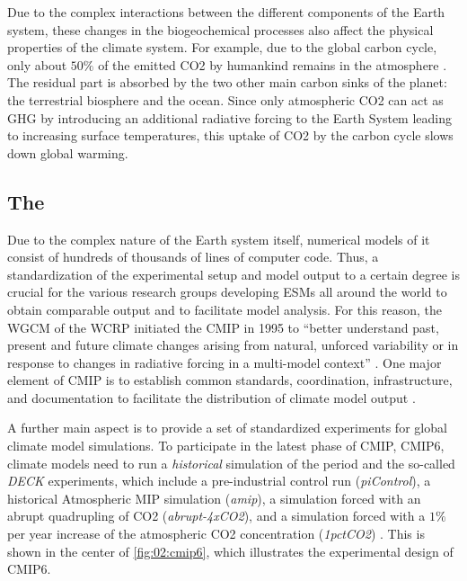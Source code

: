 Due to the complex interactions between the different components of the Earth
system, these changes in the biogeochemical processes also affect the physical
properties of the climate system. For example, due to the global carbon cycle,
only about $50 \unit{\%}$ of the emitted \ac{CO2} by humankind remains in the
atmosphere \autocite{Friedlingstein2020}. The residual part is absorbed by the
two other main carbon sinks of the planet: the terrestrial biosphere and the
ocean. Since only atmospheric \ac{CO2} can act as \ac{GHG} by introducing an
additional radiative forcing to the Earth System leading to increasing surface
temperatures, this uptake of \ac{CO2} by the carbon cycle slows down global
warming.


\subsection{The }
\label{subsec:02:cmip}

Due to the complex nature of the Earth system itself, numerical models of it
consist of hundreds of thousands of lines of computer code. Thus, a
standardization of the experimental setup and model output to a certain degree
is crucial for the various research groups developing \acp{ESM} all around the
world to obtain comparable output and to facilitate model analysis. For this
reason, the \ac{WGCM} of the \ac{WCRP} initiated the \ac{CMIP} in 1995 to
\enquote{better understand past, present and future climate changes arising
  from natural, unforced variability or in response to changes in radiative
  forcing in a multi-model context} \autocite{WCRP2020}. One major element of
\ac{CMIP} is to establish common standards, coordination, infrastructure, and
documentation to facilitate the distribution of climate model output
\autocite{Eyring2016, Juckes2020}.

A further main aspect is to provide a set of standardized experiments for
global climate model simulations. To participate in the latest phase of
\ac{CMIP}, \acs{CMIP}6, climate models need to run a \emph{historical}
simulation of the period  and the so-called \emph{\ac{DECK}}
experiments, which include a pre-industrial control run (\emph{piControl}), a
historical Atmospheric \ac{MIP} simulation (\emph{amip}), a simulation forced
with an abrupt quadrupling of \ac{CO2} (\emph{abrupt-4xCO2}), and a simulation
forced with a $1 \unit{\%}$ per year increase of the atmospheric \ac{CO2}
concentration (\emph{1pctCO2}) \autocite{Eyring2016}. This is shown in the
center of \cref{fig:02:cmip6}, which illustrates the experimental design of
\acs{CMIP}6.

